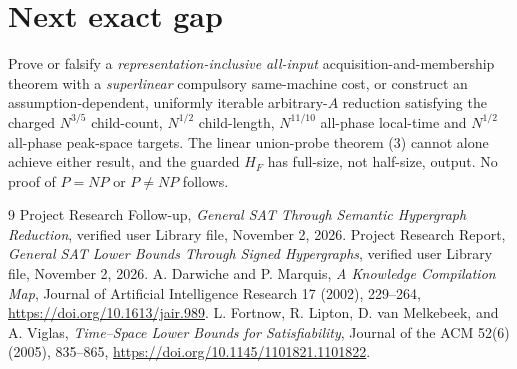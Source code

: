 \documentclass[11pt]{article}
\begin{document}
\section{Next exact gap}
Prove or falsify a \emph{representation-inclusive all-input} acquisition-and-membership theorem with a \emph{superlinear} compulsory same-machine cost, or construct an assumption-dependent, uniformly iterable arbitrary-$A$ reduction satisfying the charged $N^{3/5}$ child-count, $N^{1/2}$ child-length, $N^{11/10}$ all-phase local-time and $N^{1/2}$ all-phase peak-space targets. The linear union-probe theorem (3) cannot alone achieve either result, and the guarded $H_F$ has full-size, not half-size, output. No proof of $P=NP$ or $P\ne NP$ follows.

\begin{thebibliography}{9}
 Project Research Follow-up, \emph{General SAT Through Semantic Hypergraph Reduction}, verified user Library file, November 2, 2026.
 Project Research Report, \emph{General SAT Lower Bounds Through Signed Hypergraphs}, verified user Library file, November 2, 2026.
 A. Darwiche and P. Marquis, \emph{A Knowledge Compilation Map}, Journal of Artificial Intelligence Research 17 (2002), 229--264, \url{https://doi.org/10.1613/jair.989}.
 L. Fortnow, R. Lipton, D. van Melkebeek, and A. Viglas, \emph{Time--Space Lower Bounds for Satisfiability}, Journal of the ACM 52(6) (2005), 835--865, \url{https://doi.org/10.1145/1101821.1101822}.
\end{thebibliography}
\end{document}

